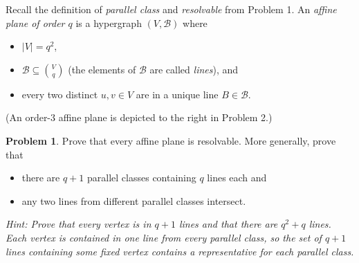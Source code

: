 \documentclass[11pt, letter]{amsart}
\theoremstyle{definition}
\newtheorem{problem}{Problem}[]
\newcommand{\cB}{\ensuremath{\mathcal B}}
\begin{document}
\begin{center}
\begin{minipage}{.5\linewidth}
  \end{minipage}
\end{center}
\clearpage

Recall the definition of \textit{parallel class} and \textit{resolvable} from Problem 1.  An \textit{affine plane of order $q$} is a hypergraph $(V, \cB)$ where
\begin{itemize}
\item $|V| = q^2$,
\item $\cB \subseteq \binom{V}{q}$ (the elements of $\cB$ are called \textit{lines}), and
\item every two distinct $u,v\in V$ are in a unique line $B \in \cB$.
\end{itemize}
(An order-$3$ affine plane is depicted to the right in Problem 2.)
\begin{problem}
  Prove that every affine plane is resolvable.  More generally, prove that
  \begin{itemize}
  \item there are $q + 1$ parallel classes containing $q$ lines each and
  \item any two lines from different parallel classes intersect.
  \end{itemize}
  \textit{Hint: Prove that every vertex is in $q + 1$ lines and that there are $q^2 + q$ lines.  Each vertex is contained in one line from every parallel class, so the set of $q + 1$ lines containing some fixed vertex contains a representative for each parallel class.}
\end{problem}
\end{document}
